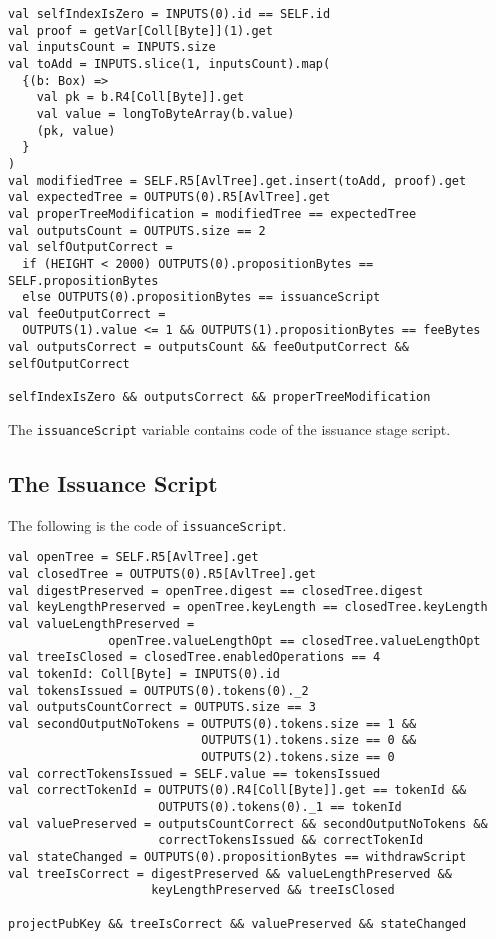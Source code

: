 \documentclass[runningheads]{llncs}
\begin{document}
\small{\begin{verbatim}
val selfIndexIsZero = INPUTS(0).id == SELF.id
val proof = getVar[Coll[Byte]](1).get
val inputsCount = INPUTS.size
val toAdd = INPUTS.slice(1, inputsCount).map(
  {(b: Box) =>
    val pk = b.R4[Coll[Byte]].get
    val value = longToByteArray(b.value)
    (pk, value)
  }
)
val modifiedTree = SELF.R5[AvlTree].get.insert(toAdd, proof).get
val expectedTree = OUTPUTS(0).R5[AvlTree].get
val properTreeModification = modifiedTree == expectedTree
val outputsCount = OUTPUTS.size == 2
val selfOutputCorrect = 
  if (HEIGHT < 2000) OUTPUTS(0).propositionBytes == SELF.propositionBytes
  else OUTPUTS(0).propositionBytes == issuanceScript 
val feeOutputCorrect = 
  OUTPUTS(1).value <= 1 && OUTPUTS(1).propositionBytes == feeBytes
val outputsCorrect = outputsCount && feeOutputCorrect && selfOutputCorrect

selfIndexIsZero && outputsCorrect && properTreeModification
\end{verbatim}
}

The \texttt{issuanceScript} variable contains code of the issuance stage script.

\subsection{The Issuance Script}
\label{ico-issuance}
The following is the code of \texttt{issuanceScript}.
\small{
\begin{verbatim}
val openTree = SELF.R5[AvlTree].get
val closedTree = OUTPUTS(0).R5[AvlTree].get
val digestPreserved = openTree.digest == closedTree.digest
val keyLengthPreserved = openTree.keyLength == closedTree.keyLength
val valueLengthPreserved = 
              openTree.valueLengthOpt == closedTree.valueLengthOpt
val treeIsClosed = closedTree.enabledOperations == 4
val tokenId: Coll[Byte] = INPUTS(0).id
val tokensIssued = OUTPUTS(0).tokens(0)._2
val outputsCountCorrect = OUTPUTS.size == 3
val secondOutputNoTokens = OUTPUTS(0).tokens.size == 1 && 
                           OUTPUTS(1).tokens.size == 0 && 
                           OUTPUTS(2).tokens.size == 0
val correctTokensIssued = SELF.value == tokensIssued
val correctTokenId = OUTPUTS(0).R4[Coll[Byte]].get == tokenId &&
                     OUTPUTS(0).tokens(0)._1 == tokenId
val valuePreserved = outputsCountCorrect && secondOutputNoTokens && 
                     correctTokensIssued && correctTokenId
val stateChanged = OUTPUTS(0).propositionBytes == withdrawScript
val treeIsCorrect = digestPreserved && valueLengthPreserved && 
                    keyLengthPreserved && treeIsClosed

projectPubKey && treeIsCorrect && valuePreserved && stateChanged
\end{verbatim}
}
\end{document}
